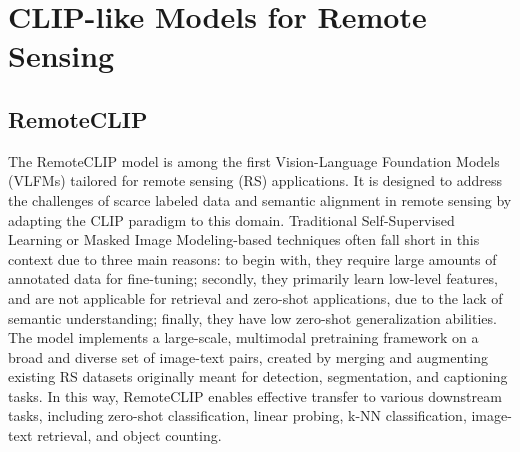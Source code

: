 \documentclass[a4paper, oneside, english]{sapthesis} %
\begin{document}

\section{CLIP-like Models for Remote Sensing}

\subsection{RemoteCLIP}

The RemoteCLIP model \cite{liu2024remoteclip} is among the first Vision-Language Foundation Models (VLFMs) tailored for remote sensing (RS) applications. It is designed to address the challenges of scarce labeled data and semantic alignment in remote sensing by adapting the CLIP paradigm to this domain. Traditional Self-Supervised Learning or Masked Image Modeling-based techniques often fall short in this context due to three main reasons: to begin with, they require large amounts of annotated data for fine-tuning; secondly, they primarily learn low-level features, and are not applicable for retrieval and zero-shot applications, due to the lack of semantic understanding; finally, they have low zero-shot generalization abilities.
The model implements a large-scale, multimodal pretraining framework on a broad and diverse set of image-text pairs, created by merging and augmenting existing RS datasets originally meant for detection, segmentation, and captioning tasks. In this way, RemoteCLIP enables effective transfer to various downstream tasks, including zero-shot classification, linear probing, k-NN classification, image-text retrieval, and object counting.
\end{document}
